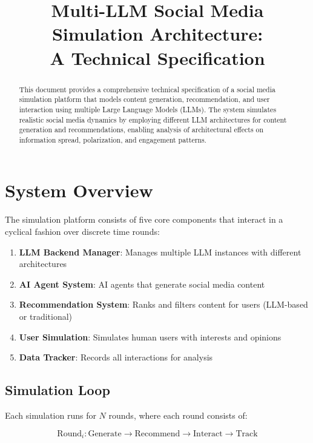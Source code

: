 \documentclass[11pt]{article}
\title{Multi-LLM Social Media Simulation Architecture:\\
A Technical Specification}
\author{}
\date{}
\begin{document}
\maketitle

\begin{abstract}
This document provides a comprehensive technical specification of a social media simulation platform that models content generation, recommendation, and user interaction using multiple Large Language Models (LLMs). The system simulates realistic social media dynamics by employing different LLM architectures for content generation and recommendations, enabling analysis of architectural effects on information spread, polarization, and engagement patterns.
\end{abstract}

\tableofcontents
\newpage

\section{System Overview}

The simulation platform consists of five core components that interact in a cyclical fashion over discrete time rounds:

\begin{enumerate}
    \item \textbf{LLM Backend Manager}: Manages multiple LLM instances with different architectures
    \item \textbf{AI Agent System}: AI agents that generate social media content
    \item \textbf{Recommendation System}: Ranks and filters content for users (LLM-based or traditional)
    \item \textbf{User Simulation}: Simulates human users with interests and opinions
    \item \textbf{Data Tracker}: Records all interactions for analysis
\end{enumerate}

\subsection{Simulation Loop}

Each simulation runs for $N$ rounds, where each round consists of:

\begin{equation}
\text{Round}_i: \text{Generate} \rightarrow \text{Recommend} \rightarrow \text{Interact} \rightarrow \text{Track}
\end{equation}
\end{document}
